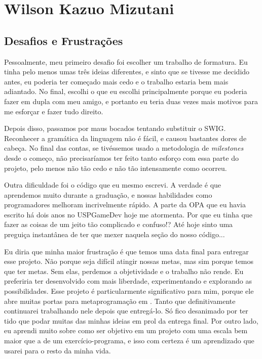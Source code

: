 \chapter{Wilson Kazuo Mizutani}
\label{cap:wil}

\section{Desafios e Frustrações}
\label{cap:wil:desafios_frustracoes}

Pessoalmente, meu primeiro desafio foi escolher um trabalho de formatura. Eu
tinha pelo menos umas três ideias diferentes, e sinto que se tivesse me decidido
antes, eu poderia ter começado mais cedo e o trabalho estaria bem mais
adiantado. No final, escolhi o que eu escolhi principalmente porque eu poderia
fazer em dupla com meu amigo, e portanto eu teria duas vezes mais motivos para
me esforçar e fazer tudo direito.

Depois disso, passamos por maus bocados tentando substituir o SWIG. Reconhecer a
gramática da linguagem \CXX{} não é fácil, e causou bastantes dores de cabeça.
No final das contas, se tivéssemos usado a metodologia de \textit{milestones}
desde o começo, não precisaríamos ter feito tanto esforço com essa parte do
projeto, pelo menos não tão cedo e não tão intensamente como ocorreu.

Outra dificuldade foi o código que eu mesmo escrevi. A verdade é que aprendemos
muito durante a graduação, e nossas habilidades como programadores melhoram
incrivelmente rápido. A parte da OPA que eu havia escrito há dois anos no
USPGameDev hoje me atormenta. Por que eu tinha que fazer as coisas de um jeito
tão complicado e confuso!? Até hoje sinto uma preguiça instantânea de ter que
mexer naquela seção do nosso código...

Eu diria que minha maior frustração é que temos uma data final para entregar
esse projeto. Não porque seja difícil atingir nossas metas, mas sim porque
temos que ter metas. Sem elas, perdemos a objetividade e o trabalho não rende.
Eu preferiria ter desenvolvido com mais liberdade, experimentando e explorando
as possibilidades. Esse projeto é particularmente significativo para mim, porque
ele abre muitas portas para metaprogramação em \CXX{}. Tanto que definitivamente
continuarei trabalhando nele depois que entregá-lo. Só fico desanimado por ter
tido que podar muitas das minhas ideias em prol da entrega final. Por outro lado,
eu aprendi muito sobre como ser objetivo em um projeto com uma escala bem maior
que a de um exercício-programa, e isso com certeza é um aprendizado que usarei
para o resto da minha vida.

